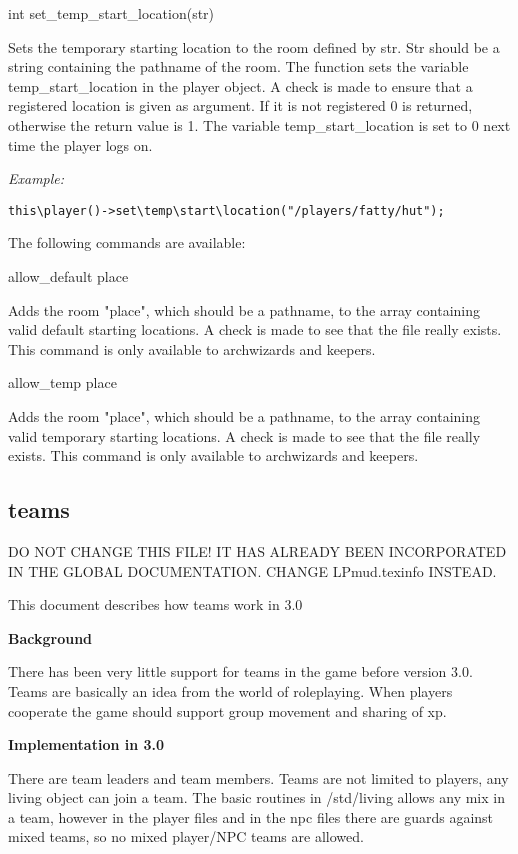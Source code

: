 int set\_temp\_start\_location(str)

Sets the temporary starting location to the room defined by str. Str
should be a string containing the pathname of the room. The function
sets the variable temp\_start\_location in the player object. A check is
made to ensure that a registered location is given as argument. If it
is not registered 0 is returned, otherwise the return value is 1. The
variable temp\_start\_location is set to 0 next time the player logs on.

{\em Example:}

\begin{verbatim}
this\player()->set\temp\start\location("/players/fatty/hut");
\end{verbatim}

The following commands are available:

allow\_default place

Adds the room "place", which should be a pathname, to the array
containing valid default starting locations. A check is made to see
that the file really exists. This command is only available to
archwizards and keepers.

allow\_temp place

Adds the room "place", which should be a pathname, to the array
containing valid temporary starting locations. A check is made to see
that the file really exists. This command is only available to
archwizards and keepers.


\subsection{teams}

DO NOT CHANGE THIS FILE! IT HAS ALREADY BEEN INCORPORATED IN THE GLOBAL
DOCUMENTATION. CHANGE LPmud.texinfo INSTEAD.

This document describes how teams work in 3.0

{\bf Background}

There has been very little support for teams in the game before version 3.0.
Teams are basically an idea from the world of roleplaying. When players
cooperate the game should support group movement and sharing of xp.

{\bf Implementation in 3.0}

There are team leaders and team members. Teams are not limited to players, any
living object can join a team. The basic routines in /std/living allows any
mix in a team, however in the player files and in the npc files there are
guards against mixed teams, so no mixed player/NPC teams are allowed.

